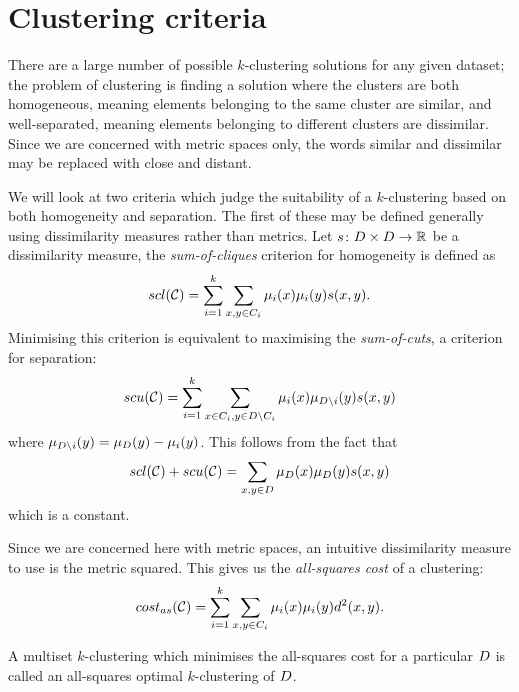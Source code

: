 \section{Clustering criteria}
\label{sec:clustering-criteria}

There are a large number of possible $k$-clustering solutions for any given
dataset; the problem of clustering is finding a solution where the clusters
are both homogeneous, meaning elements belonging to the same cluster are
similar, and well-separated, meaning elements belonging to different clusters
are dissimilar.  Since we are concerned with metric spaces only, the words
similar and dissimilar may be replaced with close and distant.

We will look at two criteria which judge the suitability of a $k$-clustering
based on both homogeneity and separation.  The first of these may be defined
generally using dissimilarity measures rather than metrics.  Let $s \colon
D \times D \to \mathbb{R}$ be a dissimilarity measure, the
\textit{sum-of-cliques} criterion for homogeneity is defined as
\begin{equation*}
  scl(\mathcal{C}) = \sum_{i=1}^{k} \sum_{x,y \in C_i} \mu_i(x) \mu_i(y) s(x,y).
\end{equation*}
Minimising this criterion is equivalent to maximising the
\textit{sum-of-cuts}, a criterion for separation:
\begin{equation*}
  scu(\mathcal{C}) = \sum_{i=1}^{k}
  \sum_{x \in C_i, y \in D \setminus C_i}
  \mu_i(x) \mu_{D \setminus i}(y) s(x,y)
\end{equation*}
where $\mu_{D \setminus i}(y) = \mu_{D}(y) - \mu_{i}(y)$.  This
follows from the fact that
\begin{equation*}
  scl(\mathcal{C}) + scu(\mathcal{C}) = \sum_{x,y \in D} \mu_{D}(x) \mu_{D}(y) s(x,y)
\end{equation*}
which is a constant.

Since we are concerned here with metric spaces, an intuitive dissimilarity
measure to use is the metric squared.  This gives us the \textit{all-squares
  cost} of a clustering:
\begin{equation}
  \label{eq:ASC}
  cost_{as}(\mathcal{C}) = \sum_{i=1}^{k} \sum_{x,y \in C_i} \mu_i(x) \mu_i(y) d^2(x,y).
\end{equation}

\begin{dfn}
  A multiset $k$-clustering which minimises the all-squares cost for a
  particular $D$ is called an all-squares optimal $k$-clustering of
  $D$.
\end{dfn}

